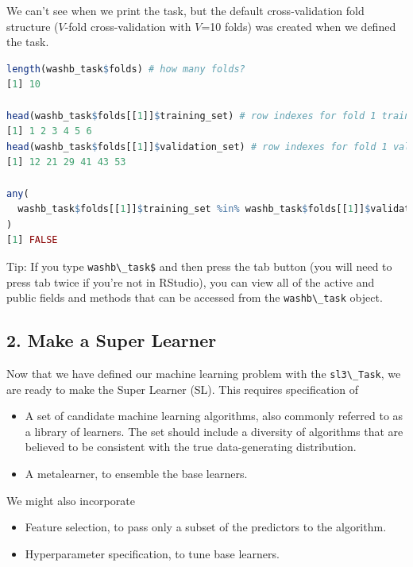 \documentclass[
  12pt, krantz2,
]{krantz}
\newcommand{\passthrough}[1]{#1}
\providecommand{\tightlist}{%
  \setlength{\itemsep}{0pt}\setlength{\parskip}{0pt}}
\theoremstyle{definition}
\theoremstyle{definition}
\theoremstyle{definition}
\newcommand{\1}{\mathbbm{1}}
\begin{document}
We can't see when we print the task, but the default cross-validation fold
structure (\(V\)-fold cross-validation with \(V\)=10 folds) was created when we
defined the task.

\begin{lstlisting}[language=R]
length(washb_task$folds) # how many folds?
[1] 10

head(washb_task$folds[[1]]$training_set) # row indexes for fold 1 training
[1] 1 2 3 4 5 6
head(washb_task$folds[[1]]$validation_set) # row indexes for fold 1 validation
[1] 12 21 29 41 43 53

any(
  washb_task$folds[[1]]$training_set %in% washb_task$folds[[1]]$validation_set
)
[1] FALSE
\end{lstlisting}

Tip: If you type \passthrough{\lstinline!washb\_task$!} and then press the tab button (you will
need to press tab twice if you're not in RStudio), you can view all of the
active and public fields and methods that can be accessed from the \passthrough{\lstinline!washb\_task!}
object.

\hypertarget{make-a-super-learner}{%
\subsection*{2. Make a Super Learner}\label{make-a-super-learner}}


Now that we have defined our machine learning problem with the \passthrough{\lstinline!sl3\_Task!}, we
are ready to make the Super Learner (SL). This requires specification of

\begin{itemize}
\tightlist
\item
  A set of candidate machine learning algorithms, also commonly referred to as
  a library of learners. The set should include a diversity of algorithms
  that are believed to be consistent with the true data-generating distribution.
\item
  A metalearner, to ensemble the base learners.
\end{itemize}

We might also incorporate

\begin{itemize}
\tightlist
\item
  Feature selection, to pass only a subset of the predictors to the algorithm.
\item
  Hyperparameter specification, to tune base learners.
\end{itemize}
\end{document}
